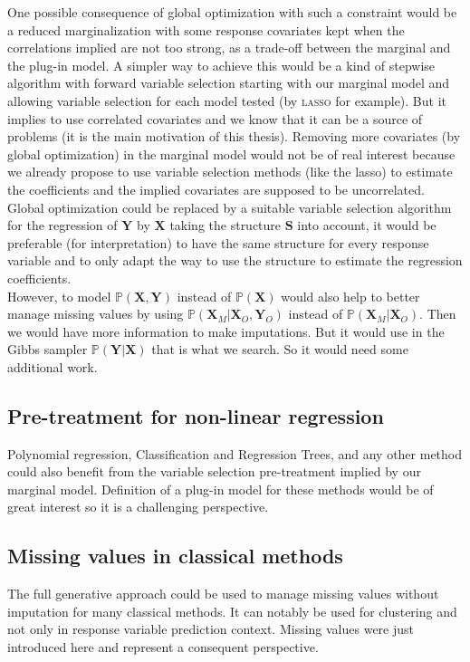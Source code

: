 \documentclass[12pt,a4paper]{report}
\begin{document}
			  One possible consequence of global optimization with such a constraint would be a reduced marginalization with some response covariates kept when the correlations implied are not too strong, as a trade-off between the marginal and the plug-in model. A simpler way to achieve this would be a kind of stepwise algorithm with forward variable selection starting with our marginal model and allowing variable selection for each model tested (by \textsc{lasso} for example). 
			  But it implies to use correlated covariates and we know that it can be a source of problems (it is the main motivation of this thesis).
			   Removing more covariates (by global optimization) in the marginal model would not be of real interest because we already propose to use variable selection methods (like the {\sc lasso}) to estimate the coefficients and the implied covariates are supposed to be uncorrelated. Global optimization could be replaced by a suitable variable selection algorithm for the regression of $\boldsymbol{Y}$ by $\boldsymbol{X}$ taking the structure $\boldsymbol{S}$ into account, it would be preferable (for interpretation) to have the same structure for every response variable and to only adapt the way to use the structure to estimate the regression coefficients. \\
							  
			  
			   However, to model $\mathbb{P}(\boldsymbol{X},\boldsymbol{Y})$ instead of $\mathbb{P}(\boldsymbol{X})$ would also help to better manage missing values by using $\mathbb{P}(\boldsymbol{X}_M|\boldsymbol{X}_O,\boldsymbol{Y}_O)$ instead of $\mathbb{P}(\boldsymbol{X}_M|\boldsymbol{X}_O)$. Then we would have more information to make imputations. But it would use in the Gibbs sampler $\mathbb{P}(\boldsymbol{Y}|\boldsymbol{X})$ that is what we search. So it would need some additional work. 
			   
		\subsection{Pre-treatment for non-linear regression}
			Polynomial regression, Classification and Regression Trees, and any other method could also benefit from the variable selection pre-treatment implied by our marginal model. Definition of a plug-in model for these methods would be of great interest so it is a challenging perspective. 
			\subsection{Missing values in classical methods}
			The full generative approach could be used to manage missing values without imputation for many classical methods.
			It can notably be used for clustering and not only in response variable prediction context.
			Missing values were just introduced here and represent a consequent perspective.
\end{document}
